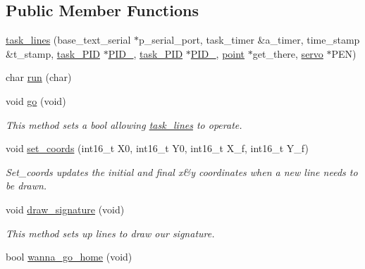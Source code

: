 \subsection*{Public Member Functions}
\begin{DoxyCompactItemize}
\item 
\hyperlink{classtask__lines_a0d04d45a83ecf3894cdb6c98942e97b6}{task\-\_\-lines} (base\-\_\-text\-\_\-serial $\ast$p\-\_\-serial\-\_\-port, task\-\_\-timer \&a\-\_\-timer, time\-\_\-stamp \&t\-\_\-stamp, \hyperlink{classtask__PID}{task\-\_\-\-P\-I\-D} $\ast$\hyperlink{classtask__lines_af20c4404da342292d6e8e8a7a6004af2}{P\-I\-D\-\_}, \hyperlink{classtask__PID}{task\-\_\-\-P\-I\-D} $\ast$\hyperlink{classtask__lines_ac53057e78b84eeb3576ee7ffb2380981}{P\-I\-D\-\_}, \hyperlink{classpoint}{point} $\ast$get\-\_\-there, \hyperlink{classservo}{servo} $\ast$P\-E\-N)
\item 
char \hyperlink{classtask__lines_adc52a1f1de31103830a06737db769a34}{run} (char)
\item 
\hypertarget{classtask__lines_a58abf21c099eba3afd75e01a41aac160}{void \hyperlink{classtask__lines_a58abf21c099eba3afd75e01a41aac160}{go} (void)}\label{classtask__lines_a58abf21c099eba3afd75e01a41aac160}

\begin{DoxyCompactList}\small\item\em This method sets a bool allowing \hyperlink{classtask__lines}{task\-\_\-lines} to operate. \end{DoxyCompactList}\item 
\hypertarget{classtask__lines_aa4d45fa38ffb509df4587afaf920f5d1}{void \hyperlink{classtask__lines_aa4d45fa38ffb509df4587afaf920f5d1}{set\-\_\-coords} (int16\-\_\-t X0, int16\-\_\-t Y0, int16\-\_\-t X\-\_\-f, int16\-\_\-t Y\-\_\-f)}\label{classtask__lines_aa4d45fa38ffb509df4587afaf920f5d1}

\begin{DoxyCompactList}\small\item\em Set\-\_\-coords updates the initial and final x\&y coordinates when a new line needs to be drawn. \end{DoxyCompactList}\item 
\hypertarget{classtask__lines_a8182baeb4e6d6608bb0b9d5bf7ee02d1}{void \hyperlink{classtask__lines_a8182baeb4e6d6608bb0b9d5bf7ee02d1}{draw\-\_\-signature} (void)}\label{classtask__lines_a8182baeb4e6d6608bb0b9d5bf7ee02d1}

\begin{DoxyCompactList}\small\item\em This method sets up lines to draw our signature. \end{DoxyCompactList}\item 
\hypertarget{classtask__lines_af24660494d5ef22eb6c03a007c7347a1}{bool \hyperlink{classtask__lines_af24660494d5ef22eb6c03a007c7347a1}{wanna\-\_\-go\-\_\-home} (void)}\label{classtask__lines_af24660494d5ef22eb6c03a007c7347a1}


\end{DoxyCompactItemize}

